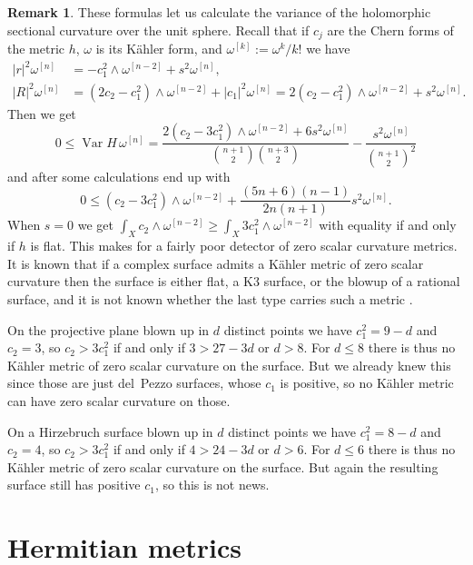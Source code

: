 \documentclass[10pt,a4paper]{amsart}
\theoremstyle{definition}
\newtheorem*{rema}{Remark}
\def\^#1{^{[#1]}}
\begin{document}
\begin{rema}
These formulas let us calculate the variance of the holomorphic sectional
curvature over the unit sphere.
Recall that if $c_j$ are the Chern forms of the metric $h$, $\omega$ is its
K\"ahler form, and $\omega\^k := \omega^k/k!$ we have
\begin{align*}
|r|^2 \omega\^n
&= -c_1^2 \wedge \omega\^{n-2} + s^2 \omega\^n,
\\
|R|^2 \omega\^n
&= (2c_2 - c_1^2) \wedge \omega\^{n-2} + |c_1|^2 \omega\^n
= 2(c_2 - c_1^2) \wedge \omega\^{n-2} + s^2\omega\^n.
\end{align*}
Then we get
$$
0 \leq \operatorname{Var} H \, \omega\^n
= \frac{2(c_2-3c_1^2)\wedge \omega\^{n-2} + 6 s^2 \omega\^n}{\binom{n+1}2\binom{n+3}2}
- \frac{s^2 \omega\^n}{\binom{n+1}{2}^2}
$$
and after some calculations end up with
$$
0 \leq
(c_2-3c_1^2)\wedge \omega\^{n-2}
+ \frac{(5n+6)(n-1)}{2n(n+1)} s^2 \omega\^n.
$$
When $s = 0$ we get $\int_X c_2 \wedge \omega\^{n-2} \geq \int_X 3c_1^2 \wedge
\omega\^{n-2}$ with equality if and only if $h$ is flat.
This makes for a fairly poor detector of zero scalar curvature metrics.
It is known that if a complex surface admits a K\"ahler metric of zero scalar
curvature then the surface is either flat, a K3 surface, or the blowup of a
rational surface, and it is not known whether the last type carries such a metric \cite{pedersen1990kahler}.

On the projective plane blown up in $d$ distinct points we have $c_1^2 = 9 -
d$ and $c_2 = 3$, so $c_2 > 3c_1^2$ if and only if $3 > 27 - 3d$ or $d > 8$.
For $d \leq 8$ there is thus no K\"ahler metric of zero scalar curvature on
the surface.
But we already knew this since those are just del~Pezzo surfaces, whose $c_1$ is
positive, so no K\"ahler metric can have zero scalar curvature on those.

On a Hirzebruch surface blown up in $d$ distinct points we have $c_1^2 = 8 -
d$ and $c_2 = 4$, so $c_2 > 3 c_1^2$ if and only if $4 > 24 - 3d$ or $d > 6$.
For $d \leq 6$ there is thus no K\"ahler metric of zero scalar curvature on
the surface.
But again the resulting surface still has positive $c_1$, so this is not news.
\end{rema}



\section{Hermitian metrics}
\end{document}
